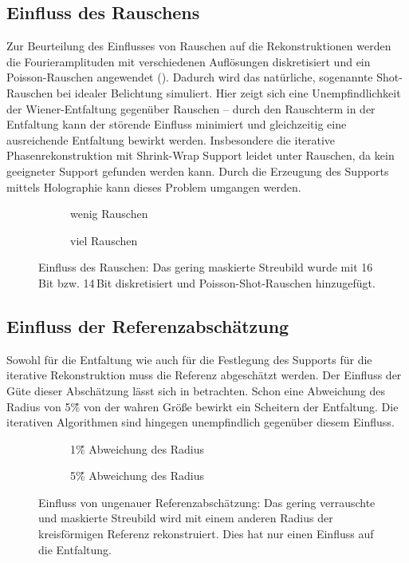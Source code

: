 \subsection{Einfluss des Rauschens}
Zur Beurteilung des Einflusses von Rauschen auf die Rekonstruktionen werden die Fourieramplituden mit verschiedenen Auflösungen diskretisiert und ein Poisson-Rauschen angewendet (). Dadurch wird das natürliche, sogenannte Shot-Rauschen bei idealer Belichtung simuliert. Hier zeigt sich eine Unempfindlichkeit der Wiener-Entfaltung gegenüber Rauschen -- durch den Rauschterm in der Entfaltung kann der störende Einfluss minimiert und gleichzeitig eine ausreichende Entfaltung bewirkt werden. Insbesondere die iterative Phasenrekonstruktion mit Shrink-Wrap Support leidet unter Rauschen, da kein geeigneter Support gefunden werden kann. Durch die Erzeugung des Supports mittels Holographie kann dieses Problem umgangen werden.
\begin{figure}
	\begin{subfigure}[b]{0.45\textwidth}
		\caption{wenig Rauschen}
	\end{subfigure}
	\hspace*{\fill}
	\begin{subfigure}[b]{0.45\textwidth}
		\caption{viel Rauschen}	
	\end{subfigure}
	\caption[2D Rekonstruktion: Rauschen]{Einfluss des Rauschen: Das gering maskierte Streubild wurde mit 16\,Bit bzw. 14\,Bit diskretisiert und Poisson-Shot-Rauschen hinzugefügt.}
	\label{fig:recon2d-noise}
\end{figure}
\subsection{Einfluss der Referenzabschätzung}
Sowohl für die Entfaltung wie auch für die Festlegung des Supports für die iterative Rekonstruktion muss die Referenz abgeschätzt werden. Der Einfluss der Güte dieser Abschätzung lässt sich in  betrachten. Schon eine Abweichung des Radius von 5\~\% von der wahren Größe bewirkt ein Scheitern der Entfaltung. Die iterativen Algorithmen sind hingegen unempfindlich gegenüber diesem Einfluss.
\begin{figure}
	\begin{subfigure}[b]{0.45\textwidth}
		\caption{1\~\% Abweichung des Radius}
	\end{subfigure}
	\hspace*{\fill}
	\begin{subfigure}[b]{0.45\textwidth}
		\caption{5\~\% Abweichung des Radius}	
	\end{subfigure}
	\caption[2D Rekonstruktion: Referenz]{Einfluss von ungenauer Referenzabschätzung: Das gering verrauschte und maskierte Streubild wird mit einem anderen Radius der kreisförmigen Referenz rekonstruiert. Dies hat nur einen Einfluss auf die Entfaltung.}
	\label{fig:recon2d-ref}
\end{figure}
